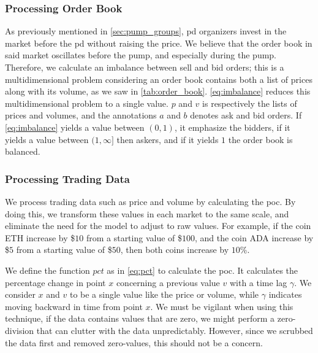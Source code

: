 \subsubsection{Processing Order Book}
As previously mentioned in \autoref{sec:pump_groups}, \ac{pd} organizers invest in the market before the \ac{pd} without raising the price. We believe that the order book in said market oscillates before the pump, and especially during the pump. Therefore, we calculate an imbalance between sell and bid orders; this is a multidimensional problem considering an order book contains both a list of prices along with its volume, as we saw in \autoref{tab:order_book}. \autoref{eq:imbalance} reduces this multidimensional problem to a single value. $p$ and $v$ is respectively the lists of prices and volumes, and the annotations $a$ and $b$ denotes ask and bid orders. If \autoref{eq:imbalance} yields a value between $(0,1)$, it emphasize the bidders, if it yields a value between $(1, \infty]$ then askers, and if it yields $1$ the order book is balanced.



\subsubsection{Processing Trading Data}
We process trading data such as price and volume by calculating the \ac{poc}. By doing this, we transform these values in each market to the same scale, and eliminate the need for the model to adjust to raw values. For example, if the coin ETH increase by \$$10$ from a starting value of \$$100$, and the coin ADA increase by \$$5$ from a starting value of \$$50$, then both coins increase by $10$\%.



We define the function $pct$ as in \autoref{eq:pct} to calculate the \ac{poc}. It calculates the percentage change in point $x$ concerning a previous value $v$ with a time lag $\gamma$. We consider $x$ and $v$ to be a single value like the price or volume, while $\gamma$ indicates moving backward in time from point $x$. We must be vigilant when using this technique, if the data contains values that are zero, we might perform a zero-division that can clutter with the data unpredictably. However, since we scrubbed the data first and removed zero-values, this should not be a concern.

